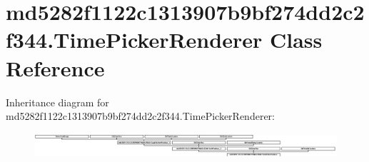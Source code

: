 \hypertarget{classmd5282f1122c1313907b9bf274dd2c2f344_1_1TimePickerRenderer}{}\section{md5282f1122c1313907b9bf274dd2c2f344.\+Time\+Picker\+Renderer Class Reference}
\label{classmd5282f1122c1313907b9bf274dd2c2f344_1_1TimePickerRenderer}
Inheritance diagram for md5282f1122c1313907b9bf274dd2c2f344.\+Time\+Picker\+Renderer\+:\begin{figure}[H]
\begin{center}
\leavevmode
\includegraphics[height=0.915033cm]{classmd5282f1122c1313907b9bf274dd2c2f344_1_1TimePickerRenderer}
\end{center}
\end{figure}
